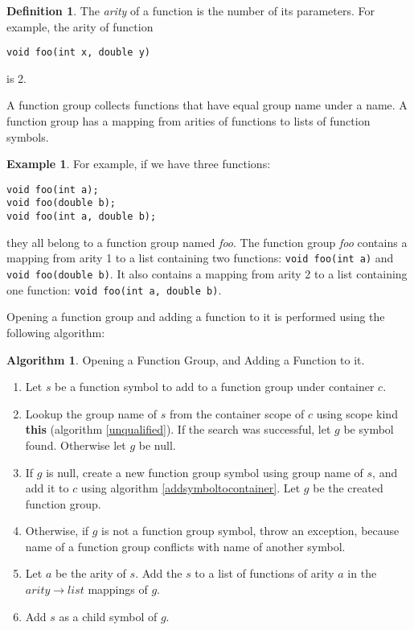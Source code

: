 \documentclass[a4paper,oneside,11pt]{book}
\theoremstyle{definition}
\newtheorem{exmp}{Example}[section]
\newtheorem{algo}{Algorithm}[section]
\newtheorem{defn}{Definition}[section]
\begin{document}
\begin{defn}\label{arity} The \emph{arity} of a function is the number of its parameters.
For example, the arity of function
\begin{verbatim}
void foo(int x, double y)
\end{verbatim}
is 2.
\end{defn}

A function group collects functions that have equal group name under a name.
A function group has a mapping from arities of functions to lists of function symbols.

\begin{exmp}
For example, if we have three functions:
\begin{verbatim}
void foo(int a);
void foo(double b);
void foo(int a, double b);
\end{verbatim}

they all belong to a function group named \emph{foo}.
The function group \emph{foo} contains a mapping from arity 1 to a list containing two functions:
\verb|void foo(int a)| and \verb|void foo(double b)|.
It also contains a mapping from arity 2 to a list containing one function:
\verb|void foo(int a, double b)|.
\end{exmp}

Opening a function group and adding a function to it is performed using the following algorithm:

\begin{algo}\label{addtofunctiongroup} Opening a Function Group, and Adding a Function to it.
\begin{enumerate}
\item
Let $s$ be a function symbol to add to a function group under container $c$.
\item
Lookup the group name of $s$ from the container scope of $c$ using scope kind \textbf{this} (algorithm \ref{unqualified}).
If the search was successful, let $g$ be symbol found. Otherwise let $g$ be null.
\item
If $g$ is null, create a new function group symbol using group name of $s$, and add it to $c$ using
algorithm \ref{addsymboltocontainer}. Let $g$ be the created function group.
\item
Otherwise, if $g$ is not a function group symbol, throw an exception, because name of a function group
conflicts with name of another symbol.
\item
Let $a$ be the arity of $s$. Add the $s$ to a list of functions of arity $a$ in the $arity \rightarrow list$ mappings of $g$.
\item
Add $s$ as a child symbol of $g$.
\end{enumerate}
\end{algo}
\end{document}
